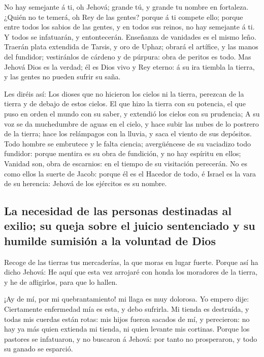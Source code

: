  No hay semejante á ti, oh Jehová; grande tú, y grande tu
nombre en fortaleza.  ¿Quién no te temerá, oh Rey de las
gentes? porque á ti compete ello; porque entre todos los sabios de las
gentes, y en todos sus reinos, no hay semejante á ti.  Y
todos se infatuarán, y entontecerán. Enseñanza de vanidades es el mismo
leño.  Traerán plata extendida de Tarsis, y oro de Uphaz;
obrará el artífice, y las manos del fundidor; vestiránlos de cárdeno y
de púrpura: obra de peritos es todo.  Mas Jehová Dios es
la verdad; él es Dios vivo y Rey eterno: á su ira tiembla la tierra, y
las gentes no pueden sufrir su saña.

 Les diréis así: Los dioses que no hicieron los cielos ni
la tierra, perezcan de la tierra y de debajo de estos cielos.
 El que hizo la tierra con su potencia, el que puso en
orden el mundo con su saber, y extendió los cielos con su prudencia;
 A su voz se da muchedumbre de aguas en el cielo, y hace
subir las nubes de lo postrero de la tierra; hace los relámpagos con la
lluvia, y saca el viento de sus depósitos.  Todo hombre
se embrutece y le falta ciencia; avergüéncese de su vaciadizo todo
fundidor: porque mentira es su obra de fundición, y no hay espíritu en
ellos;  Vanidad son, obra de escarnios: en el tiempo de
su visitación perecerán.  No es como ellos la suerte de
Jacob: porque él es el Hacedor de todo, é Israel es la vara de su
herencia: Jehová de los ejércitos es su nombre.

\hypertarget{la-necesidad-de-las-personas-destinadas-al-exilio-su-queja-sobre-el-juicio-sentenciado-y-su-humilde-sumisiuxf3n-a-la-voluntad-de-dios}{%
\subsection{La necesidad de las personas destinadas al exilio; su queja
sobre el juicio sentenciado y su humilde sumisión a la voluntad de
Dios}\label{la-necesidad-de-las-personas-destinadas-al-exilio-su-queja-sobre-el-juicio-sentenciado-y-su-humilde-sumisiuxf3n-a-la-voluntad-de-dios}}

 Recoge de las tierras tus mercaderías, la que moras en
lugar fuerte.  Porque así ha dicho Jehová: He aquí que
esta vez arrojaré con honda los moradores de la tierra, y he de
afligirlos, para que lo hallen.

 ¡Ay de mí, por mi quebrantamiento! mi llaga es muy
dolorosa. Yo empero dije: Ciertamente enfermedad mía es esta, y debo
sufrirla.  Mi tienda es destruída, y todas mis cuerdas
están rotas: mis hijos fueron sacados de mí, y perecieron: no hay ya más
quien extienda mi tienda, ni quien levante mis cortinas. 
Porque los pastores se infatuaron, y no buscaron á Jehová: por tanto no
prosperaron, y todo su ganado se esparció.

